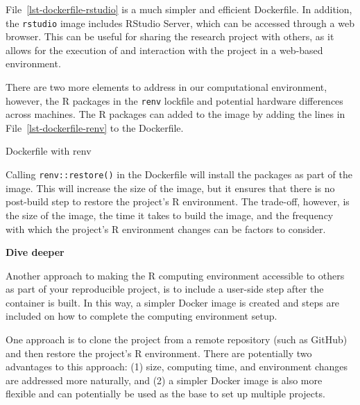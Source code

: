 \documentclass[
  letterpaper,
]{latex/krantz}
\theoremstyle{definition}
\theoremstyle{remark}
\begin{document}
File~\ref{lst-dockerfile-rstudio} is a much simpler and efficient
Dockerfile. In addition, the \texttt{rstudio} image includes RStudio
Server, which can be accessed through a web browser. This can be useful
for sharing the research project with others, as it allows for the
execution of and interaction with the project in a web-based
environment.

There are two more elements to address in our computational environment,
however, the R packages in the \texttt{renv} lockfile and potential
hardware differences across machines. The R packages can added to the
image by adding the lines in File~\ref{lst-dockerfile-renv} to the
Dockerfile.

\begin{codelisting}

\caption{\label{lst-dockerfile-renv}Dockerfile with renv}


\end{codelisting}%

Calling \texttt{renv::restore()} in the Dockerfile will install the
packages as part of the image. This will increase the size of the image,
but it ensures that there is no post-build step to restore the project's
R environment. The trade-off, however, is the size of the image, the
time it takes to build the image, and the frequency with which the
project's R environment changes can be factors to consider.

\begin{tcolorbox}[enhanced jigsaw, colframe=quarto-callout-color-frame, breakable, bottomrule=.15mm, arc=.35mm, left=2mm, opacityback=0, rightrule=.15mm, colback=white, toprule=.15mm, leftrule=.75mm]

\textbf{ Dive deeper}

Another approach to making the R computing environment accessible to
others as part of your reproducible project, is to include a user-side
step after the container is built. In this way, a simpler Docker image
is created and steps are included on how to complete the computing
environment setup.

One approach is to clone the project from a remote repository (such as
GitHub) and then restore the project's R environment. There are
potentially two advantages to this approach: (1) size, computing time,
and environment changes are addressed more naturally, and (2) a simpler
Docker image is also more flexible and can potentially be used as the
base to set up multiple projects.

\end{tcolorbox}
\end{document}
